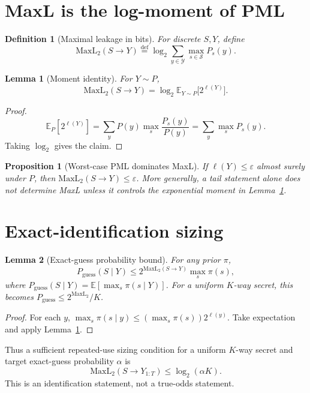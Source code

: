 \documentclass[11pt]{article}
\newcommand{\EE}{\mathbb{E}}
\newcommand{\defeq}{\stackrel{\mathrm{def}}{=}}
\newtheorem{definition}{Definition}
\newtheorem{lemma}{Lemma}
\newtheorem{proposition}{Proposition}
\begin{document}
\section{MaxL is the log-moment of PML}
\begin{definition}[Maximal leakage in bits]\label{def:maxl}
For discrete $S,Y$, define\cite{issa2020operational}
\[
\mathrm{MaxL}_2(S\to Y)\defeq\log_2\sum_{y\in\mathcal Y}\max_{s\in\mathcal S}P_s(y).
\]
\end{definition}

\begin{lemma}[Moment identity]\label{lem:moment}
For $Y\sim P$,
\[
\mathrm{MaxL}_2(S\to Y)
=
\log_2\EE_{Y\sim P}\bigl[2^{\ell(Y)}\bigr].
\]
\end{lemma}

\begin{proof}
\[
\EE_P[2^{\ell(Y)}]
=\sum_yP(y)\max_s\frac{P_s(y)}{P(y)}
=\sum_y\max_sP_s(y).
\]
Taking $\log_2$ gives the claim.
\end{proof}

\begin{proposition}[Worst-case PML dominates MaxL]
If $\ell(Y)\le\varepsilon$ almost surely under $P$, then $\mathrm{MaxL}_2(S\to Y)\le\varepsilon$.
More generally, a tail statement alone does not determine MaxL unless it controls the exponential moment in Lemma~\ref{lem:moment}.
\end{proposition}

\section{Exact-identification sizing}
\begin{lemma}[Exact-guess probability bound]\label{lem:guess}
For any prior $\pi$,
\[
P_{\mathrm{guess}}(S\mid Y)
\le
2^{\mathrm{MaxL}_2(S\to Y)}\max_s\pi(s),
\]
where $P_{\mathrm{guess}}(S\mid Y)=\EE[\max_s\pi(s\mid Y)]$.
For a uniform $K$-way secret, this becomes $P_{\mathrm{guess}}\le2^{\mathrm{MaxL}_2}/K$.
\end{lemma}

\begin{proof}
For each $y$,
$\max_s\pi(s\mid y)\le(\max_s\pi(s))2^{\ell(y)}$.
Take expectation and apply Lemma~\ref{lem:moment}.
\end{proof}

Thus a sufficient repeated-use sizing condition for a uniform $K$-way secret and target exact-guess probability $\alpha$ is
\[
\mathrm{MaxL}_2(S\to Y_{1:T})\le\log_2(\alpha K).
\]
This is an identification statement, not a true-odds statement.
\end{document}
